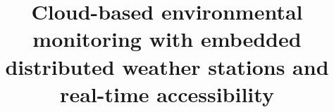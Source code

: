\title{Cloud-based environmental monitoring with embedded distributed weather stations and real-time accessibility}
